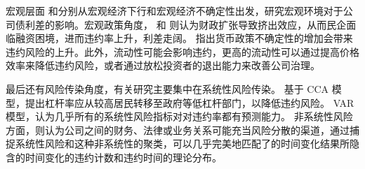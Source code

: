 宏观层面
\Textcite{bai2019common}和\Textcite{bali2021macroeconomic}分别从宏观经济下行和宏观经济不确定性出发，研究宏观环境对于公司债利差的影响。宏观政策角度，
\Textcite{梅冬州2021财政扩张}和\Textcite{2020Fiscal} 则认为财政扩张导致挤出效应，从而民企面临融资困境，进而违约率上升，利差走阔。
\Textcite{王博2019货币政策不确定性}指出货币政策不确定性的增加会带来违约风险的上升。此外，流动性可能会影响违约\cite{brogaard2017stock}，更高的流动性可以通过提高价格效率来降低违约风险，或者通过放松投资者的退出能力来改善公司治理。

最后还有风险传染角度，有关研究主要集中在系统性风险传染。
\Textcite{苟文均2016债务杠杆与系统性风险传染机制}基于 CCA 模型，提出杠杆率应从较高居民转移至政府等低杠杆部门，以降低违约风险。
\Textcite{2020Do} VAR 模型，认为几乎所有的系统性风险指标对对违约率都有预测能力。
非系统性风险方面，\Textcite{azizpour2018exploring}则认为公司之间的财务、法律或业务关系可能充当风险分散的渠道，通过捕捉系统性风险和这种非系统性的聚类，可以几乎完美地匹配了的时间变化结果所隐含的时间变化的违约计数和违约时间的理论分布。
